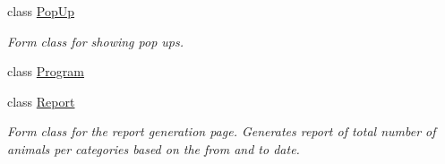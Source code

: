 \begin{DoxyCompactItemize}
class \hyperlink{classWildlifeTrackingApp_1_1PopUp}{Pop\+Up}
\begin{DoxyCompactList}\small\item\em Form class for showing pop ups. \end{DoxyCompactList}\item 
class \hyperlink{classWildlifeTrackingApp_1_1Program}{Program}
\item 
class \hyperlink{classWildlifeTrackingApp_1_1Report}{Report}
\begin{DoxyCompactList}\small\item\em Form class for the report generation page. Generates report of total number of animals per categories based on the from and to date. \end{DoxyCompactList}\end{DoxyCompactItemize}
